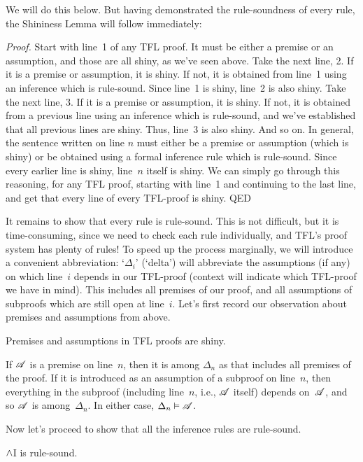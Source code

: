 We will do this below. But having demonstrated the rule-soundness of every rule, the Shininess Lemma will follow immediately:

\emph{Proof.} Start with line~1 of any TFL proof. It must be either
a premise or an assumption, and those are all shiny, as we've seen
above. Take the next line, 2. If it is a premise or assumption, it
is shiny. If not, it is obtained from line~1 using an inference
which is rule-sound. Since line~1 is shiny, line~2 is also shiny.
Take the next line, 3. If it is a premise or assumption, it
is shiny. If not, it is obtained from a previous line using an inference
which is rule-sound, and we've established that all previous lines are
shiny. Thus, line~3 is also shiny.
And so on. In general, the sentence written on line $n$ must either be
a premise or assumption (which is shiny) or be obtained using a formal
inference rule which is rule-sound. Since every earlier line is shiny,
line~$n$ itself is shiny. We can simply go through this
reasoning, for any TFL proof, starting with line~1 and continuing to
the last line, and get that every line of every TFL-proof is shiny.
QED

It remains to show that every rule is rule-sound. This is not
difficult, but it is time-consuming, since we need to check each rule
individually, and TFL's proof system has plenty of rules! To speed up
the process marginally, we will introduce a convenient abbreviation:
`$\Delta_i$' (`delta') will abbreviate the assumptions (if any) on
which line~$i$ depends in our TFL-proof (context will indicate which
TFL-proof we have in mind). This includes all premises of our proof,
and all assumptions of subproofs which are still open at line~$i$.
Let's first record our observation about premises and assumptions from above.

\begin{factoidboxe}
	Premises and assumptions in TFL proofs are shiny.
\end{factoidboxe}

If $\mathscr{A}$ is a premise on line~$n$, then it is among $\Delta_n$
as that includes all premises of the proof. If it is introduced as an
assumption of a subproof on line~$n$, then everything in the subproof
(including line~$n$, i.e., $\mathscr{A}$ itself) depends on~$\mathscr{A}$,
and so $\mathscr{A}$ is among~$\Delta_n$. In either case, $\Delta_n
\vDash \mathscr{A}$.

Now let's proceed to show that all the inference rules are rule-sound.

\begin{factoidboxe}$\wedge$I is rule-sound.
\end{factoidboxe}

